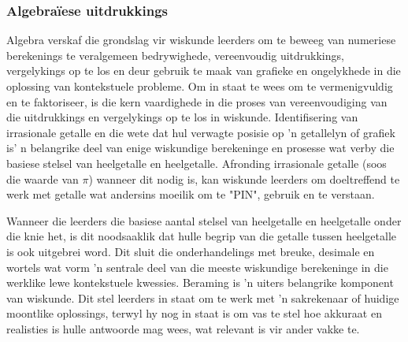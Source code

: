 \subsubsection{Algebraïese uitdrukkings}
Algebra verskaf die grondslag vir wiskunde leerders om te beweeg van
numeriese berekenings te veralgemeen bedrywighede, vereenvoudig
uitdrukkings, vergelykings op te los en deur gebruik te maak van
grafieke en ongelykhede in die oplossing van kontekstuele probleme. Om
in staat te wees om te vermenigvuldig en te faktoriseer, is die kern
vaardighede in die proses van vereenvoudiging van die uitdrukkings en
vergelykings op te los in wiskunde. Identifisering van irrasionale
getalle en die wete dat hul verwagte posisie op 'n getallelyn of
grafiek is' n belangrike deel van enige wiskundige berekeninge en
prosesse wat verby die basiese stelsel van heelgetalle en heelgetalle.
Afronding irrasionale getalle (soos die waarde van $\pi$) wanneer dit
nodig is, kan wiskunde leerders om doeltreffend te werk met getalle
wat andersins moeilik om te "PIN", gebruik en te verstaan.

Wanneer die leerders die basiese aantal stelsel van heelgetalle en heelgetalle onder die knie het, is dit noodsaaklik dat hulle begrip van die getalle tussen heelgetalle is ook uitgebrei word. Dit sluit die onderhandelings met breuke, desimale en wortels wat vorm 'n sentrale deel van die meeste wiskundige berekeninge in die werklike lewe kontekstuele kwessies.
Beraming is 'n uiters belangrike komponent van wiskunde. Dit stel leerders in staat om te werk met 'n sakrekenaar of huidige moontlike oplossings, terwyl hy nog in staat is om vas te stel hoe akkuraat en realisties is hulle antwoorde mag wees, wat relevant is vir ander vakke te.


